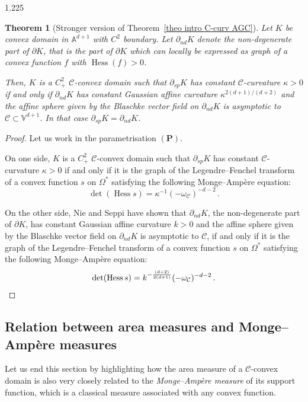 \documentclass[reqno, a4paper]{amsart}
\numberwithin{equation}{section}
\numberwithin{figure}{section}
\newtheorem{theorem}{Theorem}[section]
\theoremstyle{definition}
\theoremstyle{remark}
\newcommand{\V}{\mathbb{V}} %
\newcommand{\A}{\mathbb{A}} %
\DeclareMathOperator{\Hess}{Hess} %
\newcommand{\C}{\mathcal{C}} %
\begin{document}
\begin{spacing}{1.225}
\begin{theorem}[Stronger version of Theorem~\ref{theo intro C-curv AGC}]
\label{prop CAGC and CCcurv coincide}
Let $K$ be convex domain in $\A^{d+1}$ with $C^2$ boundary. Let $\partial_{nd} K$ denote the non-degenerate part of $\partial K$, that is the part of $\partial K$ which can locally be expressed as graph of a convex function $f$ with $\Hess(f)>0$. 

Then, $K$ is a $C^2_+$ $\C$-convex domain such that $\partial_{sp} K$ has constant $\C$-curvature $\kappa>0$ if and only if $\partial_{nd} K$ has constant Gaussian affine curvature $\kappa^{2(d+1)/(d+2)}$ and the affine sphere given by the Blaschke vector field on $\partial_{nd} K$ is asymptotic to $\C \subset \V^{d+1}$. In that case $\partial_{sp} K = \partial_{nd} K$. 
\end{theorem}
\begin{proof}
Let us work in the parametrisation $(\mathbf{P})$.

On one side, $K$ is a $C^2_+$ $\C$-convex domain such that $\partial_{sp} K$ has constant $\C$-curvature $\kappa>0$ if and only if it is the graph of the Legendre--Fenchel transform of a convex function $s$ on $\Omega^*$ satisfying the following Monge--Amp\`ere equation:
\begin{equation*}
\det(\Hess s) = \kappa^{-1}(-\omega_\C)^{-d-2} \, . 
\end{equation*}

On the other side, Nie and Seppi have shown \cite[Corollary~7.5]{Nie_Seppi_22} that $\partial_{nd} K$, the non-degenerate part of $\partial K$, has constant Gaussian affine curvature $k>0$ and the affine sphere given by the Blaschke vector field on $\partial_{nd} K$ is asymptotic to $\C$, if and only if it is the graph of the Legendre--Fenchel transform of a convex function $s$ on $\Omega^*$ satisfying the following Monge--Amp\`ere equation:
\begin{equation*}
\det(\Hess s) = k^{-\frac{(d+2)}{2(d+1)}}(-\omega_\C)^{-d-2} \, . \qedhere
\end{equation*}
\end{proof}

\subsection{Relation between area measures and Monge--Amp\`ere measures}

Let us end this section by highlighting how the area measure of a $\C$-convex domain is also very closely related to the \emph{Monge--Amp\`ere measure} of its support function, which is a classical measure associated with any convex function. 


\end{spacing}
\end{document}
